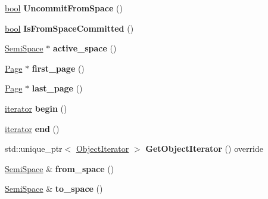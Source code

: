 \begin{DoxyCompactItemize}
\mbox{\hyperlink{classbool}{bool}} {\bfseries Uncommit\+From\+Space} ()
\item 
\mbox{\label{classv8_1_1internal_1_1NewSpace_afcfe39816a4b0f0e8c702b3083f0a60b}} 
\mbox{\hyperlink{classbool}{bool}} {\bfseries Is\+From\+Space\+Committed} ()
\item 
\mbox{\label{classv8_1_1internal_1_1NewSpace_a2be99e414fb38135104bb1e86cdcb3a4}} 
\mbox{\hyperlink{classv8_1_1internal_1_1SemiSpace}{Semi\+Space}} $\ast$ {\bfseries active\+\_\+space} ()
\item 
\mbox{\label{classv8_1_1internal_1_1NewSpace_ab17ac9939444eed643b483c5042f9179}} 
\mbox{\hyperlink{classv8_1_1internal_1_1Page}{Page}} $\ast$ {\bfseries first\+\_\+page} ()
\item 
\mbox{\label{classv8_1_1internal_1_1NewSpace_ab16a6445a9d1eaf2db247605b29dd5dc}} 
\mbox{\hyperlink{classv8_1_1internal_1_1Page}{Page}} $\ast$ {\bfseries last\+\_\+page} ()
\item 
\mbox{\label{classv8_1_1internal_1_1NewSpace_a3d6d72028ce2aae6ddd7051638486414}} 
\mbox{\hyperlink{classv8_1_1internal_1_1PageIteratorImpl}{iterator}} {\bfseries begin} ()
\item 
\mbox{\label{classv8_1_1internal_1_1NewSpace_a7aee5a294e1acbc68ab654ba207ea47a}} 
\mbox{\hyperlink{classv8_1_1internal_1_1PageIteratorImpl}{iterator}} {\bfseries end} ()
\item 
\mbox{\label{classv8_1_1internal_1_1NewSpace_a7af456af8bdafecdd6bee7d2fd1c1c75}} 
std\+::unique\+\_\+ptr$<$ \mbox{\hyperlink{classv8_1_1internal_1_1ObjectIterator}{Object\+Iterator}} $>$ {\bfseries Get\+Object\+Iterator} () override
\item 
\mbox{\label{classv8_1_1internal_1_1NewSpace_ae958dd24dbe34230fb483f1f2a3ffb4a}} 
\mbox{\hyperlink{classv8_1_1internal_1_1SemiSpace}{Semi\+Space}} \& {\bfseries from\+\_\+space} ()
\item 
\mbox{\label{classv8_1_1internal_1_1NewSpace_a2f95633b0e99fc03b84770eb9bbea433}} 
\mbox{\hyperlink{classv8_1_1internal_1_1SemiSpace}{Semi\+Space}} \& {\bfseries to\+\_\+space} ()
\end{DoxyCompactItemize}
